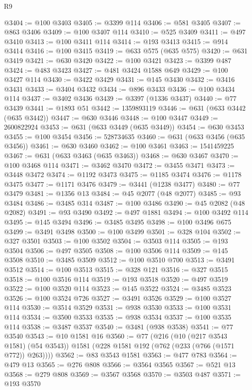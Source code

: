 \begin{lexlean}{R9}
\begin{coremodule}
{{{{{{{{{{{{{{{{{{{{{{{{{{{{{{{{{{{{{{{{{{{{{{{{{{{{{{{{{{{{{{{{{{{{{{{{{{{{{{{{{{{{{{{{{{{{{{{{{{{{{{{{{{{{@3404 := @100 @3403
@3405 := @3399 @114
@3406 := @581 @3405
@3407 := @863 @3406
@3409 := @100 @3407 @114
@3410 := @525 @3409
@3411 := @497 @3410
@3413 := @100 @3411 @114
@3414 := @193 @3413
@3415 := @914 @3414
@3416 := @100 @3415
@3419 := @633 @575 (@635 @575)
@3420 := @631 @3419
@3421 := @630 @3420
@3422 := @100 @3421
@3423 := @3399 @487
@3424 := @483 @3423
@3427 := @481 @3424 @1588 @649
@3429 := @100 @3427 @114
@3430 := @3422 @3429
@3431 := @145 @3430
@3432 := @3416 @3431
@3433 := @3404 @3432
@3434 := @896 @3433
@3436 := @100 @3434 @114
@3437 := @3402 @3436
@3439 := @3397 (@1336 @3437)
@3440 := @77 @3439
@3441 := @1893 @51
@3442 := 1359893119
@3446 := @631 (@633 @3442 (@635 @3442))
@3447 := @630 @3446
@3448 := @100 @3447
@3449 := 2600822924
@3453 := @631 (@633 @3449 (@635 @3449))
@3454 := @630 @3453
@3455 := @100 @3454
@3456 := 528734635
@3460 := @631 (@633 @3456 (@635 @3456))
@3461 := @630 @3460
@3462 := @100 @3461
@3463 := 1541459225
@3467 := @631 (@633 @3463 (@635 @3463))
@3468 := @630 @3467
@3470 := @100 @3468 @114
@3471 := @3462 @3470
@3472 := @3455 @3471
@3473 := @3448 @3472
@3474 := @1192 @3473
@3475 := @1185 @3474
@3476 := @1178 @3475
@3477 := @1171 @3476
@3479 := @3441 (@1238 @3477)
@3480 := @77 @3479
@3481 := @1356 @13
@3484 := @45 @2077 (@48 @2077)
@3485 := @93 @3484
@3486 := @3485 @314
@3487 := @100 @3486
@3490 := @45 @2082 (@48 @2082)
@3491 := @93 @3490
@3492 := @497 @1881
@3494 := @100 @3492 @114
@3495 := @145 @3494
@3496 := @3485 @3495
@3498 := @100 @3496 @675
@3499 := @3491 @3498
@3500 := @100 @3499
@3501 := @328 @104
@3502 := @327 @3501
@3503 := @100 @3502
@3504 := @3503 @114
@3505 := @193 @3504
@3506 := @497 @3505
@3508 := @100 @3506 @114
@3509 := @145 @3508
@3510 := @3485 @3509
@3512 := @100 @3510 @700
@3513 := @3491 @3512
@3514 := @100 @3513
@3515 := @328 @121
@3516 := @327 @3515
@3518 := @100 @3516 @114
@3519 := @193 @3518
@3520 := @497 @3519
@3522 := @100 @3520 @114
@3523 := @145 @3522
@3524 := @3485 @3523
@3526 := @100 @3524 @726
@3527 := @3491 @3526
@3529 := @100 @3527 @114
@3530 := @3514 @3529
@3531 := @938 @3530
@3533 := @100 @3531 @114
@3534 := @3500 @3533
@3535 := @938 @3534
@3537 := @100 @3535 @114
@3538 := @3487 @3537
@3540 := @3481 (@938 @3538)
@3541 := @77 @3540
@3543 := @10 @1581 @16
@3560 := @77
    (@216
      (@10 (@217 @3543 @1581) (@54 @3543))
      @1581
      (@228 @1581 @192 (@762 (@233 (@766 (@1571 @772)) @263))))
@3562 := @83 @3543 @1581
@3563 := @477 @783
@3564 := @479 @13
@3565 := @276 @808
@3566 := @3564 @3565
@3567 := @521 @13
@3568 := @279 @808
@3569 := @3567 @3568
@3570 := @3503 @487
@3571 := @193 @3570
}}}}}}}}}}}}}}}}}}}}}}}}}}}}}}}}}}}}}}}}}}}}}}}}}}}}}}}}}}}}}}}}}}}}}}}}}}}}}}}}}}}}}}}}}}}}}}}}}}}}}}}}}}}}
\end{coremodule}
\end{lexlean}
